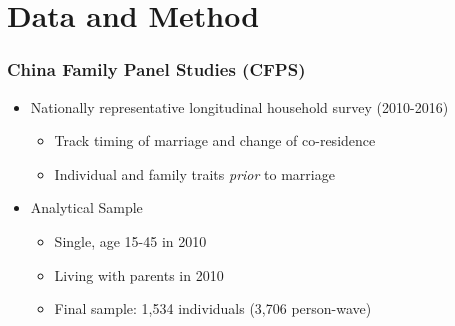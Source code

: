 \documentclass{beamer}
\begin{document}




\section{Data and Method}

\begin{frame}{}
\tableofcontents[currentsection]
\end{frame}


\begin{frame}
\frametitle{China Family Panel Studies (CFPS)}
    \begin{itemize}
            \item  Nationally representative longitudinal household survey (2010-2016)
              \begin{itemize}
              \item Track timing of marriage and change of co-residence   
                  \item Individual and family traits \textit{prior} to marriage 
              \end{itemize}
      \pause         
            \item  Analytical Sample 
            \begin{itemize}
                \item Single, age 15-45 in 2010
                \item Living with parents in 2010
                \item Final sample: 1,534 individuals (3,706 person-wave)
            \end{itemize}
    \end{itemize}

\end{frame}
\end{document}
